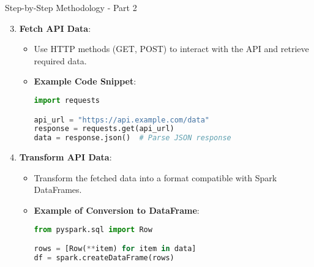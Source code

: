 \documentclass[aspectratio=169]{beamer}
\begin{document}
\begin{frame}{Step-by-Step Methodology - Part 2}
    \begin{enumerate}
        \setcounter{enumi}{2}
        \item \textbf{Fetch API Data}:
        \begin{itemize}
            \item Use HTTP methods (GET, POST) to interact with the API and retrieve required data.
            \item \textbf{Example Code Snippet}:
            \begin{lstlisting}[language=Python]
import requests

api_url = "https://api.example.com/data"
response = requests.get(api_url)
data = response.json()  # Parse JSON response
            \end{lstlisting}
        \end{itemize}
        
        \item \textbf{Transform API Data}:
        \begin{itemize}
            \item Transform the fetched data into a format compatible with Spark DataFrames.
            \item \textbf{Example of Conversion to DataFrame}:
            \begin{lstlisting}[language=Python]
from pyspark.sql import Row

rows = [Row(**item) for item in data]
df = spark.createDataFrame(rows)
            \end{lstlisting}
        \end{itemize}
    \end{enumerate}
\end{frame}
\end{document}
